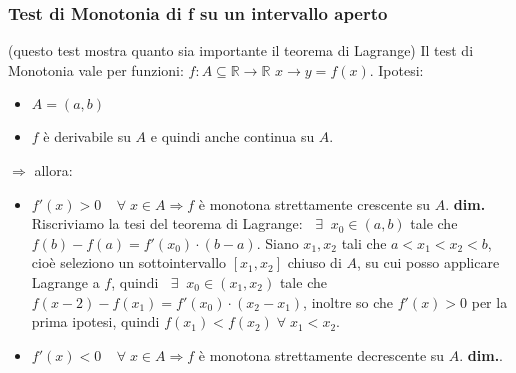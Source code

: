 \subsubsection*{Test di Monotonia di f su un intervallo aperto}
(questo test mostra quanto sia importante il teorema di Lagrange)\newline
Il test di Monotonia vale per funzioni:\newline
$f: A \subseteq \mathbb{R} \rightarrow  \mathbb{R}$\newline
$x \rightarrow  y = f(x)$.\newline
Ipotesi:
\begin{itemize}
    \item $A = (a,b)$
    \item $f$ è derivabile su $A$ e quindi anche continua su $A$.
\end{itemize}
$\Longrightarrow$ allora:
\begin{itemize}
    \item $f'(x) > 0 \;\;\; \;\forall\;x \in A \Longrightarrow f$ è monotona strettamente crescente su $A$.  \newline
    \textbf{dim.} \newline
    Riscriviamo la tesi del teorema di Lagrange: $\;\;\exists\;\; x_0 \in (a,b)$ tale che $f(b)-f(a) = f'(x_0)\cdot (b-a)$.\newline
    Siano $x_1, x_2 $ tali che $a < x_1 < x_2 < b $, cioè seleziono un sottointervallo $[x_1, x_2]$ chiuso di $A$, su cui posso applicare Lagrange a $f$, quindi $\;\;\exists\;\; x_0 \in(x_1, x_2) $ tale che $f(x-2) - f(x_1) = f'(x_0) \cdot (x_2 - x_1)$, inoltre so che $f'(x) > 0$ per la prima ipotesi, quindi $f(x_1) < f(x_2) \;\forall\; x_1<x_2$.
    \item $f'(x) < 0 \;\;\; \;\forall\;x \in A \Longrightarrow f$ è monotona strettamente decrescente su $A$. \newline
    \textbf{dim.}. 
\end{itemize}
